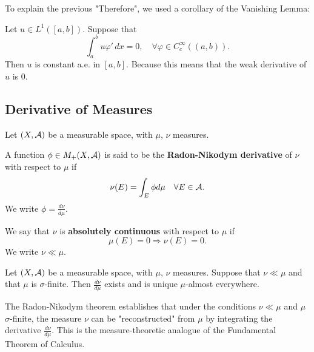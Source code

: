 \clearpage
To explain the previous "Therefore", we used a corollary of the Vanishing Lemma:

\begin{corollary}
Let $u \in L^1([a,b])$. Suppose that
\[
\int_a^b u \varphi' \, dx = 0, \quad \forall \varphi \in C_c^\infty((a,b)).
\]
Then $u$ is constant a.e. in $[a,b]$. Because this means that the weak derivative of $u$ is $0$.
\end{corollary}

\subsection{Derivative of Measures}

Let $(X,\mathcal{A})$ be a measurable space, with $\mu$, $\nu$ measures.
\begin{definition}
A function $\phi \in M_+(X,\mathcal{A})$ is said to be the \textbf{Radon-Nikodym derivative} of $\nu$ with respect to $\mu$ if
\[
\nu(E) = \int_E \phi  d\mu \quad \forall E \in \mathcal{A}.
\]
We write $\phi = \frac{d\nu}{d\mu}$.
\end{definition}

\begin{definition}
We say that $\nu$ is \textbf{absolutely continuous} with respect to $\mu$ if
\[
\mu(E) = 0 \Rightarrow \nu(E) = 0.
\]
We write $\nu \ll \mu$.
\end{definition}

\begin{theorem}
Let $(X,\mathcal{A})$ be a measurable space, with $\mu$, $\nu$ measures. Suppose that $\nu \ll \mu$ and that $\mu$ is $\sigma$-finite. Then $\frac{d\nu}{d\mu}$ exists and is unique $\mu$-almost everywhere.
\end{theorem}


\begin{remark}
The Radon-Nikodym theorem establishes that under the conditions $\nu \ll \mu$ and $\mu$ $\sigma$-finite, the measure $\nu$ can be "reconstructed" from $\mu$ by integrating the derivative $\frac{d\nu}{d\mu}$. This is the measure-theoretic analogue of the Fundamental Theorem of Calculus.
\end{remark}
